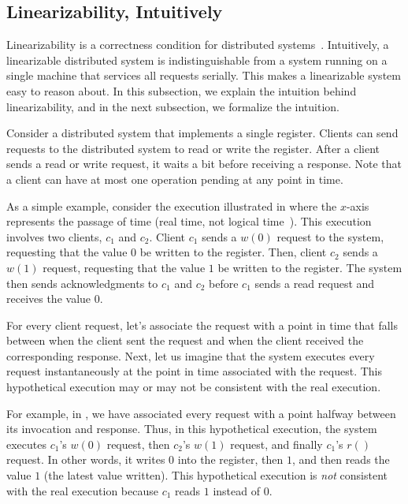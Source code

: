 {}

\subsection{Linearizability, Intuitively}
Linearizability is a correctness condition for distributed
systems~\cite{herlihy1990linearizability}.  Intuitively, a linearizable
distributed system is indistinguishable from a system running on a single
machine that services all requests serially. This makes a linearizable system
easy to reason about. In this subsection, we explain the intuition behind
linearizability, and in the next subsection, we formalize the intuition.

Consider a distributed system that implements a single register. Clients can
send requests to the distributed system to read or write the register. After a
client sends a read or write request, it waits a bit before receiving a
response. Note that a client can have at most one operation pending at any
point in time.

{}

As a simple example, consider the execution illustrated in
 where the $x$-axis represents the passage of
time (real time, not logical time~\cite{lamport2019time}). This execution
involves two clients, $c_1$ and $c_2$. Client $c_1$ sends a $w(0)$ request to
the system, requesting that the value $0$ be written to the register. Then,
client $c_2$ sends a $w(1)$ request, requesting that the value $1$ be written
to the register. The system then sends acknowledgments to $c_1$ and $c_2$
before $c_1$ sends a read request and receives the value $0$.

For every client request, let's associate the request with a point in time that
falls between when the client sent the request and when the client received the
corresponding response. Next, let us imagine that the system executes every
request instantaneously at the point in time associated with the request. This
hypothetical execution may or may not be consistent with the real execution.

For example, in , we have associated every
request with a point halfway between its invocation and response. Thus, in this
hypothetical execution, the system executes $c_1$'s $w(0)$ request, then
$c_2$'s $w(1)$ request, and finally $c_1$'s $r()$ request. In other words, it
writes $0$ into the register, then $1$, and then reads the value $1$ (the
latest value written). This hypothetical execution is \emph{not} consistent
with the real execution because $c_1$ reads $1$ instead of $0$.

